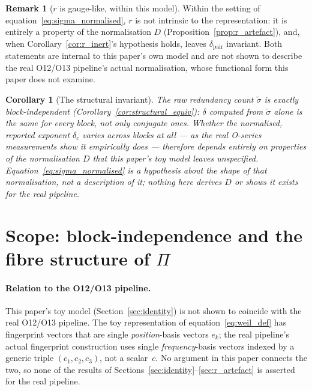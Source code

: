 \documentclass[11pt,a4paper]{article}
\newtheorem{corollary}[theorem]{Corollary}
\theoremstyle{definition}
\newtheorem{remark}[theorem]{Remark}
\begin{document}
    \begin{remark}[$r$ is gauge-like, within this model]
      \label{rem:r_gauge}
      Within the setting of equation~\eqref{eq:sigma_normalised}, $r$ is
      not intrinsic to the representation: it is entirely a property of
      the normalisation $D$ (Proposition~\ref{prop:r_artefact}), and, when
      Corollary~\ref{cor:r_inert}'s hypothesis holds, leaves
      $\delta_{\mathrm{pair}}$ invariant.
      Both statements are internal to this paper's own model and are not
      shown to describe the real O12/O13 pipeline's actual normalisation,
      whose functional form this paper does not examine.
    \end{remark}

    \begin{corollary}[The structural invariant]
      \label{cor:invariant}
      The raw redundancy count $\tilde\sigma$ is exactly block-independent
      (Corollary~\ref{cor:structural_equiv}): $\delta$ computed from
      $\tilde\sigma$ alone is the \emph{same} for every block, not only
      conjugate ones.
      Whether the \emph{normalised, reported} exponent $\delta_c$ varies
      across blocks at all --- as the real O-series measurements show it
      empirically does --- therefore depends entirely on properties of the
      normalisation $D$ that this paper's toy model leaves unspecified.
      Equation~\eqref{eq:sigma_normalised} is a hypothesis about the shape
      of that normalisation, not a description of it; nothing here derives
      $D$ or shows it exists for the real pipeline.
    \end{corollary}

  \section{Scope: block-independence and the fibre structure of \texorpdfstring{$\Pi$}{Pi}}
  \label{sec:why_pair}

  \paragraph{Relation to the O12/O13 pipeline.}
    This paper's toy model (Section~\ref{sec:identity}) is not shown to
    coincide with the real O12/O13 pipeline.
    The toy representation of equation~\eqref{eq:weil_def} has fingerprint
    vectors that are single \emph{position}-basis vectors $e_k$; the real
    pipeline's actual fingerprint construction uses single
    \emph{frequency}-basis vectors indexed by a generic triple
    $(c_1,c_2,c_3)$, not a scalar~$c$.
    No argument in this paper connects the two, so none of the results of
    Sections~\ref{sec:identity}--\ref{sec:r_artefact} is asserted for the
    real pipeline.
\end{document}
